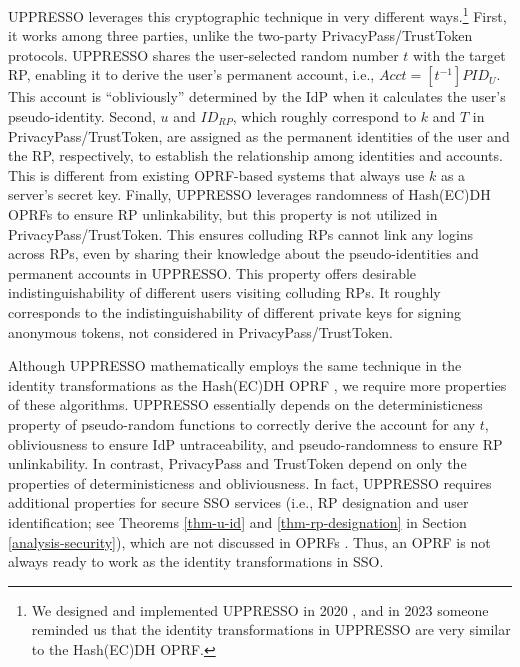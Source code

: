 UPPRESSO leverages this cryptographic technique in very different ways.\footnote{We designed and implemented UPPRESSO in 2020 \cite{uppresso-arxiv}, and in 2023 someone reminded us that the identity transformations in UPPRESSO are very similar to the Hash(EC)DH OPRF.} 
First, 
it works among three parties, unlike the two-party PrivacyPass/TrustToken protocols.
UPPRESSO shares the user-selected random number $t$ with the target RP,
enabling it to derive the user's permanent account, i.e., $Acct = [t^{-1}]PID_{U}$. This account is ``obliviously'' determined by the IdP when it calculates the user's pseudo-identity.
Second, $u$ and $ID_{RP}$, which roughly correspond to $k$ and $T$ in PrivacyPass/TrustToken, are assigned as the permanent identities of the user and the RP, respectively, to establish the relationship among identities and accounts.
This is different from existing OPRF-based systems  \cite{privacypass, trusttoken, strong-oprf, oprf-bitcoin-wallet, pesto, oprf-ot-si, pp-ss, Private-Contact-Discovery, o-kms, oprf-deduplication} that always use $k$ as a server's secret key.
Finally, UPPRESSO leverages randomness of Hash(EC)DH OPRFs to ensure RP unlinkability, but this property is not utilized in PrivacyPass/TrustToken.
This ensures colluding RPs cannot link any logins across RPs,
even by sharing their knowledge about the pseudo-identities and permanent accounts in UPPRESSO.
This property offers desirable indistinguishability of different users visiting colluding RPs.
It roughly corresponds to the indistinguishability of different private keys for signing anonymous tokens, not considered in PrivacyPass/TrustToken. 

Although UPPRESSO mathematically employs the same technique in the identity transformations as the Hash(EC)DH OPRF \cite{oprf-proved,voprf-proved}, we require more properties of these algorithms. %
UPPRESSO essentially 
depends on the deterministicness property of pseudo-random functions to correctly derive the account for any $t$, obliviousness to ensure IdP untraceability, 
and pseudo-randomness to ensure RP unlinkability. 
In contrast, PrivacyPass and TrustToken \cite{privacypass,trusttoken} depend on only the properties of deterministicness and obliviousness.
In fact, UPPRESSO requires additional properties for secure SSO services 
    \cite{understanding-arxiv} (i.e., RP designation and user identification; see Theorems \ref{thm-u-id} and \ref{thm-rp-designation} in Section \ref{analysis-security}),
    which are not discussed in OPRFs \cite{sok-oprf,oprf-proved,voprf-proved}.
Thus, an OPRF is not always ready to work as the identity transformations in SSO.

